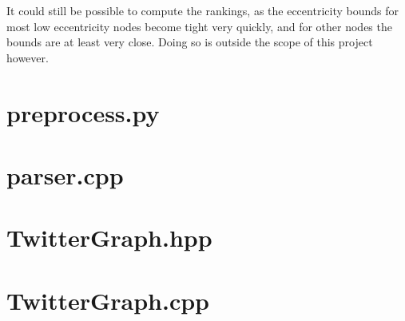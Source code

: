 \documentclass[a4paper,10pt,hidelinks]{article}
\begin{document}
It could still be possible to compute the rankings, as the eccentricity bounds for most low eccentricity nodes become tight very quickly, and for other nodes the bounds are at least very close. Doing so is outside the scope of this project however.

\pagebreak

\appendix

\section{preprocess.py}
\label{lst:preprocess}

\pagebreak


\section{parser.cpp}



\pagebreak

\section{TwitterGraph.hpp}



\pagebreak

\section{TwitterGraph.cpp}



\pagebreak
\end{document}
